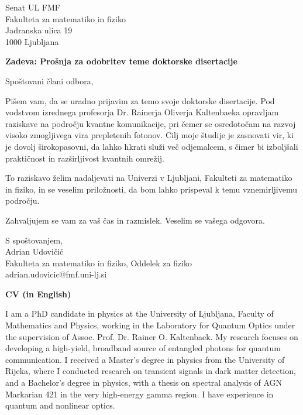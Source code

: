 \documentclass{article}
\theoremstyle{mytheoremstyle}
\theoremstyle{mytheoremstyle}
\theoremstyle{myproblemstyle}
\begin{document}
\noindent Senat UL FMF\\
    Fakulteta za matematiko in fiziko\\
    Jadranska ulica 19\\
    1000 Ljubljana\\

\vspace{.5cm}

\begin{center}
    \textbf{Zadeva: Prošnja za odobritev teme doktorske disertacije}
\end{center}
\vspace{.5cm}

Spoštovani člani odbora,

Pišem vam, da se uradno prijavim za temo svoje doktorske disertacije.
Pod vodstvom izrednega profesorja Dr. Rainerja Oliverja Kaltenbaeka opravljam raziskave na področju kvantne komunikacije,
pri čemer se osredotočam na razvoj visoko zmogljivega vira prepletenih fotonov.
Cilj moje študije je zasnovati vir, ki je dovolj širokopasovni, da lahko hkrati služi več odjemalcem,
s čimer bi izboljšali praktičnost in razširljivost kvantnih omrežij.

To raziskavo želim nadaljevati na Univerzi v Ljubljani,
Fakulteti za matematiko in fiziko, in se veselim priložnosti,
da bom lahko prispeval k temu vznemirljivemu področju.

Zahvaljujem se vam za vaš čas in razmislek. Veselim se vašega odgovora.

S spoštovanjem,\\
Adrian Udovičić\\
Fakulteta za matematiko in fiziko, Oddelek za fiziko\\
adrian.udovicic@fmf.uni-lj.si


\clearpage
\pagestyle{plain}

\vspace{1cm}

\begin{center}
    \textbf{CV (in English)}
\end{center}
I am a PhD candidate in physics at the University of Ljubljana, Faculty of Mathematics and Physics,
working in the Laboratory for Quantum Optics under the supervision of Assoc. Prof. Dr. Rainer O. Kaltenbaek.
My research focuses on developing a high-yield, broadband source of entangled photons for quantum communication.
I received a Master’s degree in physics from the University of Rijeka,
where I conducted research on transient signals in dark matter detection,
and a Bachelor’s degree in physics, with a thesis on spectral analysis of AGN Markarian 421 in the very high-energy gamma region.
I have experience in quantum and nonlinear optics.
\end{document}
